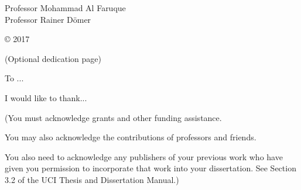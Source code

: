 



\othercommitteemembers
{
  Professor Mohammad Al Faruque\\
  Professor Rainer Dömer
}


\copyrightdeclaration
{
  {\copyright} {2017} \Authorname
}


\dedications
{
  (Optional dedication page)
  
  To ...
}

\acknowledgments
{
  I would like to thank...
  
  (You must acknowledge grants and other funding assistance. 
  
  You may also acknowledge the contributions of professors and
  friends.
  
  You also need to acknowledge any publishers of your previous
  work who have given you permission to incorporate that work
  into your dissertation. See Section 3.2 of the UCI Thesis and
  Dissertation Manual.)
}



